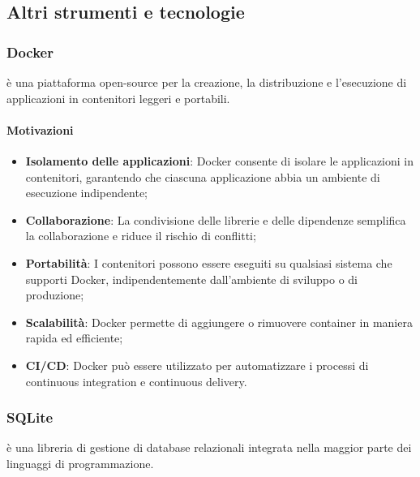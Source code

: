 \subsection{Altri strumenti e tecnologie}\label{sec:tecnologie-generali}

\subsubsection{Docker}\label{sec:docker}
\par {} è una piattaforma open-source per la creazione, la distribuzione e l'esecuzione di applicazioni in contenitori leggeri e portabili.
\paragraph*{Motivazioni}
\begin{itemize}
  \item \textbf{Isolamento delle applicazioni}: Docker consente di isolare le applicazioni in contenitori, garantendo che ciascuna applicazione abbia un ambiente di esecuzione indipendente;
  \item \textbf{Collaborazione}: La condivisione delle librerie e delle dipendenze semplifica la collaborazione e riduce il rischio di conflitti;
  \item \textbf{Portabilità}: I contenitori possono essere eseguiti su qualsiasi sistema che supporti Docker, indipendentemente dall'ambiente di sviluppo o di produzione;
  \item \textbf{Scalabilità}: Docker permette di aggiungere o rimuovere container in maniera rapida ed efficiente;
  \item \textbf{CI/CD}: Docker può essere utilizzato per automatizzare i processi di continuous integration e continuous delivery.
\end{itemize}

\subsubsection{SQLite}\label{sec:SQLite}
\par {} è una libreria di gestione di database relazionali integrata nella maggior parte dei linguaggi di programmazione.
